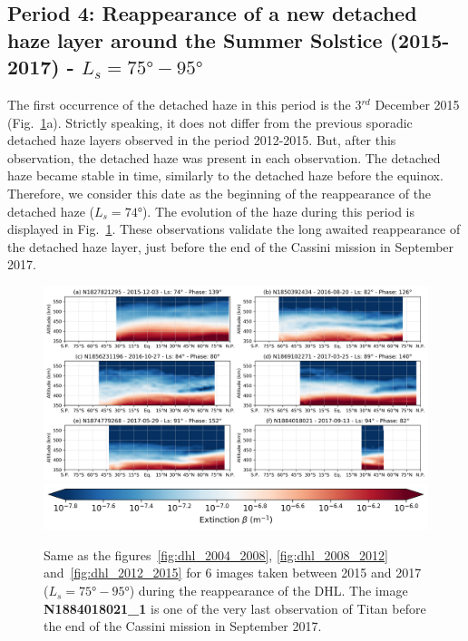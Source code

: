 \subsection{Period 4: Reappearance of a new detached haze layer around the Summer Solstice (2015-2017) - $L_s=\ang{75}-\ang{95}$}

The first occurrence of the detached haze in this period is the 3$^{rd}$ December 2015
(Fig.~\ref{fig:dhl_2015_2017}a). Strictly speaking, it
does not differ from the previous sporadic detached haze layers observed in the period 2012-2015. But, after
this observation, the detached haze was present in each observation. The detached haze became stable in time,
similarly to the detached haze before the equinox. Therefore, we consider this date as the beginning of the
reappearance of the detached haze ($L_s=\ang{74}$). The evolution of the haze during this period is displayed in
Fig.~\ref{fig:dhl_2015_2017}. These observations validate the long awaited reappearance of the detached haze layer,
just before the end of the Cassini mission in September 2017.

\begin{figure}[!ht]
    \centering
    \includegraphics[width=\textwidth]{Fig/Lat_beta-2015_2017.png}
    \includegraphics[width=.5\textwidth]{Fig/Extinction_colorbar.png}\vspace{-.3cm}
    \caption{Same as the figures~\ref{fig:dhl_2004_2008}, \ref{fig:dhl_2008_2012}
    and~\ref{fig:dhl_2012_2015} for 6 images taken between 2015 and 2017
    ($L_s=\ang{75}-\ang{95}$) during the reappearance of the DHL.
    The image \textbf{N1884018021\_1} is one of the very last observation of Titan before
    the end of the Cassini mission in September 2017.}
    \label{fig:dhl_2015_2017}
\end{figure}

